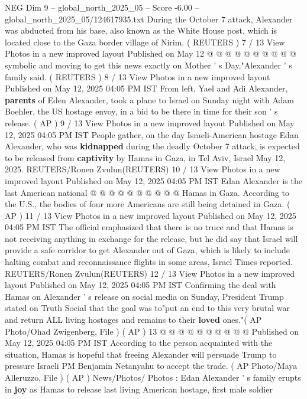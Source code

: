\begin{textsample}{NEG Dim 9 – global\_north\_2025\_05 – Score -6.00 – global\_north\_2025\_05/124617935.txt}
During the October 7 attack, Alexander was abducted from his base, also known as the White House post, which is located close to the Gaza border village of Nirim. ( REUTERS ) 7 / 13 View Photos in a new improved layout Published on May 12 @ @ @ @ @ @ @ @ @ @ symbolic and moving to get this news exactly on Mother ' s Day,"Alexander ' s family said. ( REUTERS ) 8 / 13 View Photos in a new improved layout Published on May 12, 2025 04:05 PM IST From left, Yael and Adi Alexander, \textbf{parents} of Eden Alexander, took a plane to Israel on Sunday night with Adam Boehler, the US hostage envoy, in a bid to be there in time for their son ' s release. ( AP ) 9 / 13 View Photos in a new improved layout Published on May 12, 2025 04:05 PM IST People gather, on the day Israeli-American hostage Edan Alexander, who was \textbf{kidnapped} during the deadly October 7 attack, is expected to be released from \textbf{captivity} by Hamas in Gaza, in Tel Aviv, Israel May 12, 2025.
REUTERS/Ronen Zvulun(REUTERS) 10 / 13 View Photos in a new improved layout Published on May 12, 2025 04:05 PM IST Edan Alexander is the last American national @ @ @ @ @ @ @ @ @ @ Hamas in Gaza.
According to the U.S., the bodies of four more Americans are still being detained in Gaza. ( AP ) 11 / 13 View Photos in a new improved layout Published on May 12, 2025 04:05 PM IST The official emphasized that there is no truce and that Hamas is not receiving anything in exchange for the release, but he did say that Israel will provide a safe corridor to get Alexander out of Gaza, which is likely to include halting combat and reconnaissance flights in some areas, Israel Times reported.
REUTERS/Ronen Zvulun(REUTERS) 12 / 13 View Photos in a new improved layout Published on May 12, 2025 04:05 PM IST Confirming the deal with Hamas on Alexander ' s release on social media on Sunday, President Trump stated on Truth Social that the goal was to"put an end to this very brutal war and return ALL living hostages and remains to their \textbf{loved} ones."( AP Photo/Ohad Zwigenberg, File ) ( AP ) 13 @ @ @ @ @ @ @ @ @ @ Published on May 12, 2025 04:05 PM IST According to the person acquainted with the situation, Hamas is hopeful that freeing Alexander will persuade Trump to pressure Israeli PM Benjamin Netanyahu to accept the trade. ( AP Photo/Maya Alleruzzo, File ) ( AP ) News/Photos/ Photos : Edan Alexander ' s family erupts in \textbf{joy} as Hamas to release last living American hostage, first male soldier

\end{textsample}

